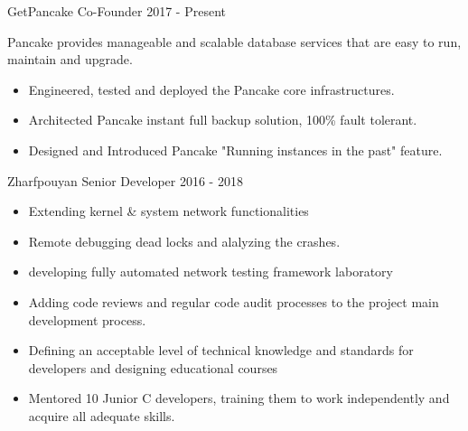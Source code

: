 \documentclass[12pt]{developercv}
\begin{document}
\begin{entrylist}
{		%
		}
	\entry
		{GetPancake}
		{Co-Founder}
		{2017 - Present}
		{
			Pancake provides manageable and scalable database services that
			are easy to run, maintain and upgrade.\\

			\begin{itemize}
				\itemsep0em
				\item Engineered, tested and deployed the Pancake core infrastructures.\\
				\item Architected Pancake instant full backup solution, 100\% fault tolerant.\\
				\item Designed and Introduced Pancake "Running instances in the past" feature.\\
			\end{itemize}
		}
	\entry
		{Zharfpouyan}
		{Senior Developer}
		{2016 - 2018}
		{
		\begin{itemize}
			\itemsep0em
			\item Extending kernel \& system network functionalities
			\item Remote debugging dead locks and alalyzing the crashes.
			\item developing fully automated network testing framework laboratory
			\item Adding code reviews and regular code audit processes to the project
			      main development process.
			\item Defining an acceptable level of technical knowledge and standards for
			      developers and designing educational courses
			\item Mentored 10 Junior C developers, training them to work independently and
			      acquire all adequate skills.
		\end{itemize}
}
\end{entrylist}
\end{document}
